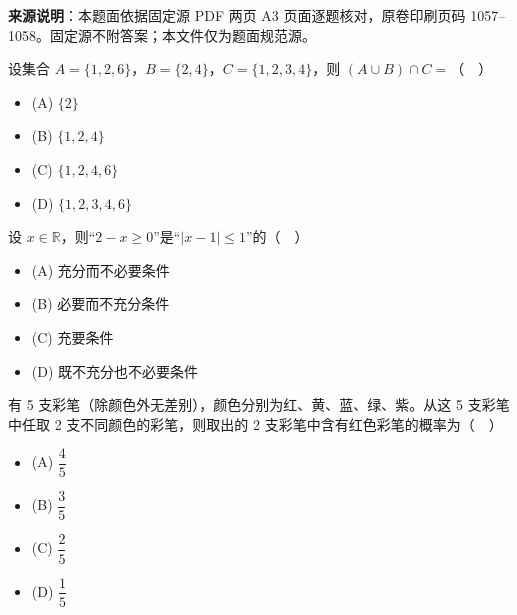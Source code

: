 

\begin{gktip}
\textbf{来源说明}：本题面依据固定源 PDF 两页 A3 页面逐题核对，原卷印刷页码 1057–1058。固定源不附答案；本文件仅为题面规范源。
\end{gktip}


\begin{question}
设集合 $A=\{1,2,6\}$，$B=\{2,4\}$，$C=\{1,2,3,4\}$，则 $(A\cup B)\cap C=$（　）

\begin{itemize}
\item (A) $\{2\}$
\item (B) $\{1,2,4\}$
\item (C) $\{1,2,4,6\}$
\item (D) $\{1,2,3,4,6\}$
\end{itemize}

\end{question}
\begin{question}
设 $x\in\mathbb R$，则“$2-x\geqslant0$”是“$|x-1|\leqslant1$”的（　）

\begin{itemize}
\item (A) 充分而不必要条件
\item (B) 必要而不充分条件
\item (C) 充要条件
\item (D) 既不充分也不必要条件
\end{itemize}

\end{question}
\begin{question}
有 5 支彩笔（除颜色外无差别），颜色分别为红、黄、蓝、绿、紫。从这 5 支彩笔中任取 2 支不同颜色的彩笔，则取出的 2 支彩笔中含有红色彩笔的概率为（　）

\begin{itemize}
\item (A) $\dfrac45$
\item (B) $\dfrac35$
\item (C) $\dfrac25$
\item (D) $\dfrac15$
\end{itemize}

\Needspace{0.4\textheight}
\end{question}
